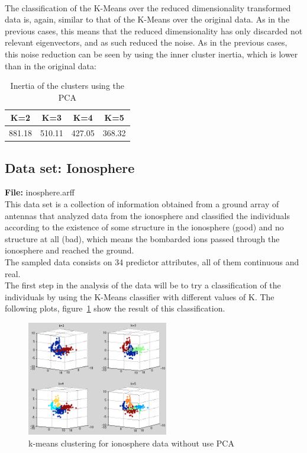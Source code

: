 \documentclass[12pt, a4paper]{article}
\begin{document}
\paragraph{}The classification of the K-Means over the reduced dimensionality transformed data is, again, similar to that of the K-Means over the original data. As in the previous cases, this means that the reduced dimensionality has only discarded not relevant eigenvectors, and as such reduced the noise. As in the previous cases, this noise reduction can be seen by using the inner cluster inertia, which is lower than in the original data:
\begin{table}[ht!]
	\centering
	\begin{tabular}{|c|c|c|c|}
		\hline
		\rowcolor[gray]{0.85} \textbf{K=2}&\textbf{K=3}&\textbf{K=4}&\textbf{K=5}\\\hline
		881.18&510.11&427.05&368.32\\\hline
	\end{tabular}
	\label{tab:carsPCA}
	\caption{Inertia of the clusters using the PCA}
\end{table}
\subsection{Data set: Ionosphere} %
\label{sub:data_set_ionosphere}
\textbf{File:} inosphere.arff\\

This data set is a collection of information obtained from a ground array of antennas that analyzed data from the ionosphere and classified the individuals according to the existence of some structure in the ionosphere (good) and no structure at all (bad), which means the bombarded ions passed through the ionosphere and reached the ground.\\

The sampled data consists on 34 predictor attributes, all of them continuous and real.\\

The first step in the analysis of the data will be to try a classification of the individuals by using the K-Means classifier with different values of K. The following plots, figure~\ref{fig:Ionosphere_1} show the result of this classification.
\begin{figure}[ht!]
	\centering
	\includegraphics[width=0.55\textwidth]{img/Ionosphere_1}
	\caption{k-means clustering for ionosphere data without use PCA}
	\label{fig:Ionosphere_1}
\end{figure}
\end{document}
